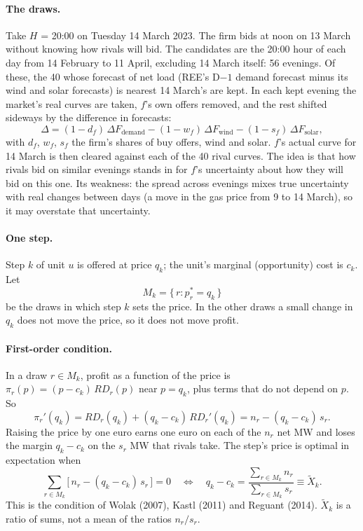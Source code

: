 \documentclass[11pt]{article}
\newcommand{\Xt}{\tilde X}
\begin{document}
\paragraph{The draws.} Take $H$ = 20:00 on Tuesday 14 March 2023. The firm bids at noon on
13 March without knowing how rivals will bid. The candidates are the 20:00 hour of each day
from 14 February to 11 April, excluding 14 March itself: 56 evenings. Of these, the 40 whose
forecast of net load (REE's D$-1$ demand forecast minus its wind and solar forecasts) is
nearest 14 March's are kept. In each kept evening the market's real curves are taken, $f$'s
own offers removed, and the rest shifted sideways by the difference in forecasts:
\[
  \Delta = (1-d_f)\,\Delta F_{\text{demand}} - (1-w_f)\,\Delta F_{\text{wind}} - (1-s_f)\,\Delta F_{\text{solar}},
\]
with $d_f$, $w_f$, $s_f$ the firm's shares of buy offers, wind and solar. $f$'s actual curve for
14 March is then cleared against each of the 40 rival curves. The idea is that how rivals
bid on similar evenings stands in for $f$'s uncertainty about how they will bid on this one.
Its weakness: the spread across evenings mixes true uncertainty with real changes between
days (a move in the gas price from 9 to 14 March), so it may overstate that uncertainty.

\paragraph{One step.} Step $k$ of unit $u$ is offered at price $q_k$; the unit's marginal
(opportunity) cost is $c_k$. Let
\[
  M_k = \{\, r : p_r^* = q_k \,\}
\]
be the draws in which step $k$ sets the price. In the other draws a small change in $q_k$
does not move the price, so it does not move profit.

\paragraph{First-order condition.} In a draw $r \in M_k$, profit as a function of the price
is $\pi_r(p) = (p - c_k)\,RD_r(p)$ near $p=q_k$, plus terms that do not depend on $p$. So
\[
  \pi_r'(q_k) = RD_r(q_k) + (q_k - c_k)\,RD_r'(q_k) = n_r - (q_k - c_k)\,s_r .
\]
Raising the price by one euro earns one euro on each of the $n_r$ net MW and loses the
margin $q_k - c_k$ on the $s_r$ MW that rivals take. The step's price is optimal in
expectation when
\[
  \sum_{r \in M_k} \bigl[\, n_r - (q_k - c_k)\, s_r \,\bigr] = 0
  \quad\Longleftrightarrow\quad
  q_k - c_k = \frac{\sum_{r \in M_k} n_r}{\sum_{r \in M_k} s_r} \equiv \Xt_k .
\]
This is the condition of Wolak (2007), Kastl (2011) and Reguant (2014). $\Xt_k$ is a ratio of
sums, not a mean of the ratios $n_r/s_r$.
\end{document}
